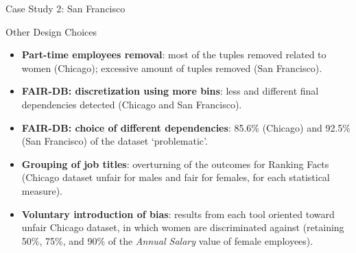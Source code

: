 \documentclass[usenames,dvipsnames]{beamer}
\begin{document}
    
    \begin{frame}{Case Study 2: San Francisco}
        \begin{figure}
            \hfill
        \end{figure}
    \end{frame}
    
    
    \begin{frame}{Other Design Choices}
        \begin{itemize}
            \item \textbf{Part-time employees removal}: most of the tuples removed related to women (Chicago); excessive amount of tuples removed (San Francisco).
            \item \textbf{FAIR-DB: discretization using more bins}: less and different final dependencies detected (Chicago and San Francisco).
            \item \textbf{FAIR-DB: choice of different dependencies}: 85.6\% (Chicago) and 92.5\% (San Francisco) of the dataset `problematic'.
            \item \textbf{Grouping of job titles}: overturning of the outcomes for Ranking Facts (Chicago dataset unfair for males and fair for females, for each statistical measure).
            \item \textbf{Voluntary introduction of bias}: results from each tool oriented toward unfair Chicago dataset, in which women are discriminated against (retaining 50\%, 75\%, and 90\% of the \textit{Annual Salary} value of female employees).
        \end{itemize}
    \end{frame}
\end{document}
